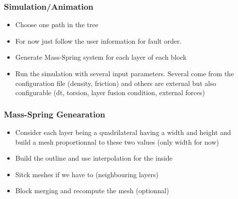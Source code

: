 \documentclass{beamer}
\begin{document}
	\begin{frame}
	\frametitle{Simulation/Animation}
	\begin{itemize}
	\item Choose one path in the tree
	\item For now just follow the user information for fault order.
	\item Generate Mass-Spring system for each layer of each block 
	\item Run the simulation with several input parameters. Several come from the configuration file (density, friction) and others are external but also configurable (dt, torsion, layer fusion condition, external forces)
	\end{itemize}
    \end{frame}


    \begin{frame} 
	\frametitle{Mass-Spring Genearation}
	\begin{itemize}
	\item Consider each layer being a quadrilateral having a width and height and build a mesh proportionnal to these two values (only width for now)
	\item Build the outline and use interpolation for the inside
	\item Sitck meshes if we have to (neighbouring layers)
	\item Block merging and recompute the mesh (optionnal)
	\end{itemize}
    \end{frame}
    
	
    \begin{frame} 
    \end{frame}   
    
\end{document}
